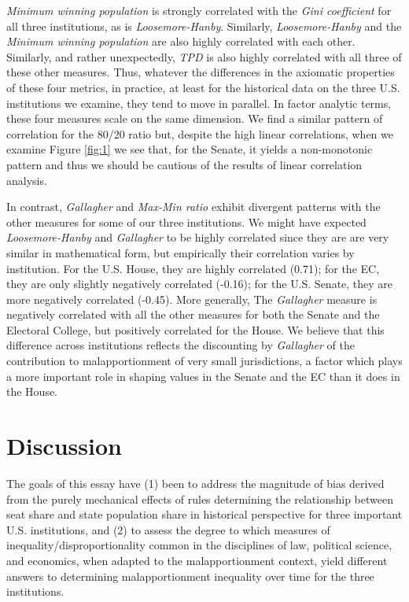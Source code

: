  \textit{Minimum winning population} is strongly correlated with the \textit{Gini coefficient} for all three institutions, as is \textit{Loosemore-Hanby}. Similarly, \textit{Loosemore-Hanby} and the \textit{Minimum winning population} are also highly correlated with each other. Similarly, and rather unexpectedly, \textit{TPD} is also highly correlated with all three of these other measures. Thus, whatever the differences in the axiomatic properties of these four metrics, in practice, at least for the historical data on the three U.S. institutions we examine, they tend to move in parallel. In factor analytic terms, these four measures scale on the same dimension. We find a similar pattern of correlation for the 80/20 ratio but, despite the high linear correlations, when we examine Figure \ref{fig:1} we see that, for the Senate, it yields a non-monotonic pattern and thus we should be cautious of the results of linear correlation analysis.
 
 In contrast, \textit{Gallagher} and \textit{Max-Min ratio} exhibit divergent patterns with the other measures for some of our three institutions. We might have expected \textit{Loosemore-Hanby} and \textit{Gallagher} to be highly correlated since they are are very similar in mathematical form, but empirically their correlation varies by institution. For the U.S. House, they are highly correlated (0.71); for the EC, they are only slightly negatively correlated (-0.16); for the U.S. Senate, they are more negatively correlated (-0.45). More generally, The \textit{Gallagher} measure is negatively correlated with all the other measures for both the Senate and the Electoral College, but positively correlated for the House. We believe that this difference across institutions reflects the discounting by \textit{Gallagher} of the contribution to malapportionment of very small jurisdictions, a factor which plays a more important role in shaping values in the Senate and the EC than it does in the House.  

\section{Discussion} \label{sec:discussion}
% 
The goals of this essay have (1) been to address the magnitude of bias derived from the purely mechanical effects of rules determining the relationship between seat share and state population share in historical perspective for three important U.S. institutions, and (2) to assess the degree to which measures of inequality/disproportionality common in the disciplines of law, political science, and economics, when adapted to the malapportionment context, yield different answers to determining malapportionment inequality over time for the three institutions. 

